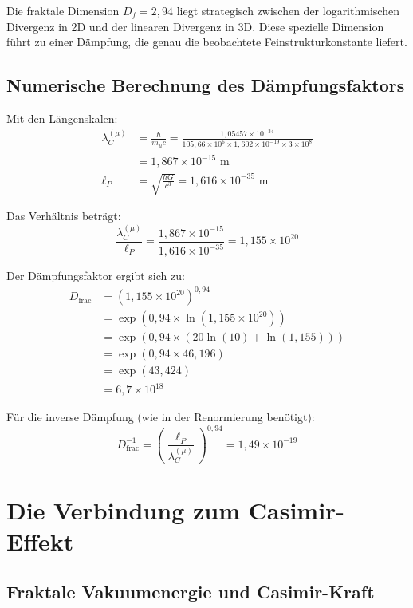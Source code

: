 \documentclass[12pt,a4paper]{article}
\theoremstyle{definition}
\begin{document}
	Die fraktale Dimension $D_f = 2{,}94$ liegt strategisch zwischen der logarithmischen Divergenz in 2D und der linearen Divergenz in 3D. Diese spezielle Dimension führt zu einer Dämpfung, die genau die beobachtete Feinstrukturkonstante liefert.
	
	\subsection{Numerische Berechnung des Dämpfungsfaktors}
	
	Mit den Längenskalen:
	\begin{align}
		\lambda_C^{(\mu)} &= \frac{\hbar}{m_\mu c} = \frac{1{,}05457 \times 10^{-34}}{105{,}66 \times 10^6 \times 1{,}602 \times 10^{-19} \times 3 \times 10^8}\\
		&= 1{,}867 \times 10^{-15} \text{ m}\\
		\ell_P &= \sqrt{\frac{\hbar G}{c^3}} = 1{,}616 \times 10^{-35} \text{ m}
	\end{align}
	
	Das Verhältnis beträgt:
	\begin{equation}
		\frac{\lambda_C^{(\mu)}}{\ell_P} = \frac{1{,}867 \times 10^{-15}}{1{,}616 \times 10^{-35}} = 1{,}155 \times 10^{20}
	\end{equation}
	
	Der Dämpfungsfaktor ergibt sich zu:
	\begin{align}
		D_{\text{frac}} &= \left(1{,}155 \times 10^{20}\right)^{0{,}94}\\
		&= \exp(0{,}94 \times \ln(1{,}155 \times 10^{20}))\\
		&= \exp(0{,}94 \times (20 \ln(10) + \ln(1{,}155)))\\
		&= \exp(0{,}94 \times 46{,}196)\\
		&= \exp(43{,}424)\\
		&= 6{,}7 \times 10^{18}
	\end{align}
	
	Für die inverse Dämpfung (wie in der Renormierung benötigt):
	\begin{equation}
		D_{\text{frac}}^{-1} = \left(\frac{\ell_P}{\lambda_C^{(\mu)}}\right)^{0{,}94} = 1{,}49 \times 10^{-19}
	\end{equation}
	
	\section{Die Verbindung zum Casimir-Effekt}
	
	\subsection{Fraktale Vakuumenergie und Casimir-Kraft}
	
\end{document}
